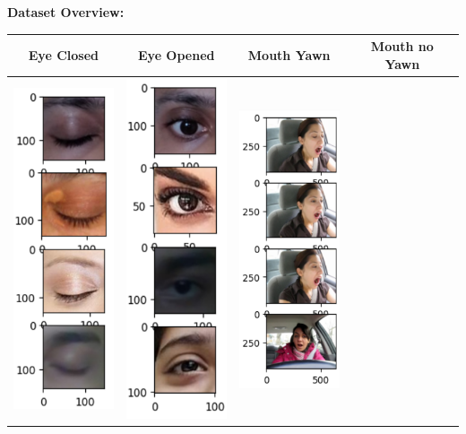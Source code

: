 \documentclass{modeleRapport}
\begin{document}
\textbf{Dataset Overview:} \\
\begin{table}[H]
    \centering
    \begin{tabular}{|c|c|c|c|}
        \hline
        Eye Closed & Eye Opened & Mouth Yawn & Mouth no Yawn \\
        \hline
        \includegraphics[width=3cm]{Images/eyeClosed.png}
        &
        \includegraphics[width=3cm]{Images/eyeOpen.png}
        &
        \includegraphics[width=3cm]{Images/yawn.png}

\end{tabular}
\end{table}
\end{document}
